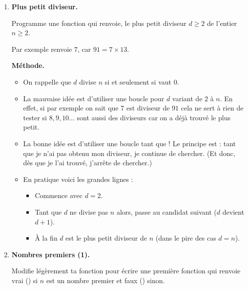 \documentclass[11pt,class=report,crop=false]{standalone}
\begin{document}
\begin{activite}



\begin{enumerate}
  \item \textbf{Plus petit diviseur.}
  
  Programme une fonction  qui renvoie, le plus petit diviseur $d\ge2$ de l'entier $n\ge2$.
  
  Par exemple  renvoie $7$, car $91 = 7 \times 13$.
  
  \medskip
  
  \textbf{Méthode.}
  \begin{itemize}
    \item On rappelle que $d$ divise $n$ si et seulement si  vaut $0$.
    \item La mauvaise idée est d'utiliser une boucle \og{}pour $d$ variant de $2$ à $n$\fg{}. En effet, si par exemple on sait que $7$ est diviseur de $91$ cela ne sert à rien de tester si $8,9,10\ldots$ sont aussi des diviseurs car on a déjà trouvé le plus petit.
    
    \item La bonne idée est d'utiliser une boucle \og{}tant que\fg{} !
    Le principe est : \og{}tant que je n'ai pas obtenu mon diviseur, je continue de chercher\fg{}. (Et donc, dès que je l'ai trouvé, j'arrête de chercher.)
    
    \item En pratique voici les grandes lignes :
    \begin{itemize}
      \item Commence avec $d=2$.
      \item Tant que $d$ ne divise pas $n$ alors, passe au candidat suivant ($d$ devient $d+1$).
      \item À la fin $d$ est le plus petit diviseur de $n$ (dans le pire des cas $d=n$).
     \end{itemize} 
  \end{itemize}
  
  
  \item \textbf{Nombres premiers (1).}
  
  Modifie légèrement ta fonction  pour écrire une première fonction  qui renvoie \og{}vrai\fg{} () si $n$ est un nombre premier et \og{}faux\fg{} () sinon.
  

\end{enumerate}
\end{activite}
\end{document}
